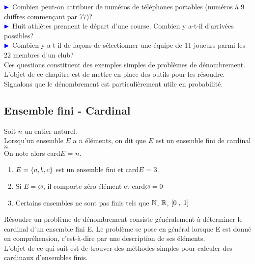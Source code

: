 


  
  
  ${\color{blue}\blacktriangleright } $  Combien peut-on attribuer de numéros de téléphones portables (numéros à 9 chiffres commençant par 77)?\\

 ${\color{blue}\blacktriangleright } $ Huit athlètes prennent le départ d'une course. Combien y a-t-il d'arrivées possibles? \\

$ {\color{blue}\blacktriangleright } $ Combien y a-t-il de façons de sélectionner une équipe de 11 joueurs parmi les 22 membres d'un club? \\

Ces questions constituent des exemples simples de problèmes de  dénombrement. \\
L'objet de ce chapitre est de mettre en place des outils pour les résoudre. \\
 Signalons que le dénombrement est particulièrement utile en probabilité. 


\subsection{Ensemble fini - Cardinal}
\begin{definition}
Soit $ n$ un entier naturel.\\
Lorsqu'un ensemble $ E $ a $ n $ éléments, on dit que $ E $ est un ensemble  fini de cardinal  $ n. $  \\
On note alors  card$ E $ = $n$. 
\end{definition}
\begin{example}
\begin{enumerate}
\item  $ E= \left\{a, b, c\right\}$ est un ensemble fini et card$ E $ = $3.$
\item Si $ E =\varnothing $, il comporte zéro élément et  card$ \varnothing =0$
\item Certains ensembles ne sont pas finis tels que $ \mathbb{N} $, $ \mathbb{R} $, $ \left[0\;,\; 1\right] $
\end{enumerate}
\end{example}
\begin{remark}

Résoudre un problème de dénombrement consiste généralement à déterminer le cardinal d'un ensemble fini E. Le problème se pose en général lorsque E est donné en compréhension, c'est-à-dire par une description de  ses éléments.  \\  L'objet de ce qui suit est de trouver des méthodes simples pour calculer des cardinaux d'ensembles finis.
\end{remark} 

